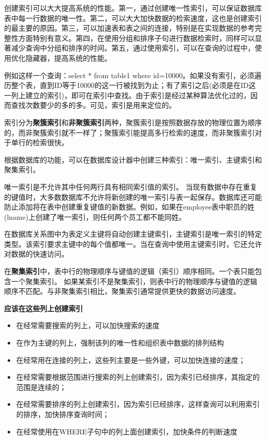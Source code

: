 创建索引可以大大提高系统的性能。第一，通过创建唯一性索引，可以保证数据库表中每一行数据的唯一性。第二，可以大大加快数据的检索速度，这也是创建索引的最主要的原因。第三，可以加速表和表之间的连接，特别是在实现数据的参考完整性方面特别有意义。第四，在使用分组和排序子句进行数据检索时，同样可以显著减少查询中分组和排序的时间。第五，通过使用索引，可以在查询的过程中，使用优化隐藏器，提高系统的性能。

例如这样一个查询：select * from table1 where id=10000。如果没有索引，必须遍历整个表，直到ID等于10000的这一行被找到为止；有了索引之后(必须是在ID这一列上建立的索引)，即可在索引中查找。由于索引是经过某种算法优化过的，因而查找次数要少的多的多。可见，索引是用来定位的。

索引分为\textbf{聚簇索引}和\textbf{非聚簇索引}两种，聚簇索引是按照数据存放的物理位置为顺序的，而非聚簇索引就不一样了；聚簇索引能提高多行检索的速度，而非聚簇索引对于单行的检索很快。

根据数据库的功能，可以在数据库设计器中创建三种索引：唯一索引、主键索引和聚集索引。


唯一索引是不允许其中任何两行具有相同索引值的索引。
当现有数据中存在重复的键值时，大多数数据库不允许将新创建的唯一索引与表一起保存。数据库还可能防止添加将在表中创建重复键值的新数据。例如，如果在employee表中职员的姓(lname)上创建了唯一索引，则任何两个员工都不能同姓。

在数据库关系图中为表定义主键将自动创建主键索引，主键索引是唯一索引的特定类型。该索引要求主键中的每个值都唯一。当在查询中使用主键索引时，它还允许对数据的快速访问。

在\textbf{聚集索引}中，表中行的物理顺序与键值的逻辑（索引）顺序相同。一个表只能包含一个聚集索引。
如果某索引不是聚集索引，则表中行的物理顺序与键值的逻辑顺序不匹配。与非聚集索引相比，聚集索引通常提供更快的数据访问速度。

\textbf{应该在这些列上创建索引}

\begin{itemize}
    \item 
在经常需要搜索的列上，可以加快搜索的速度
    \item 
在作为主键的列上，强制该列的唯一性和组织表中数据的排列结构
    \item 
在经常用在连接的列上，这些列主要是一些外键，可以加快连接的速度；
    \item 
在经常需要根据范围进行搜索的列上创建索引，因为索引已经排序，其指定的范围是连续的；
    \item 
在经常需要排序的列上创建索引，因为索引已经排序，这样查询可以利用索引的排序，加快排序查询时间；
    \item 
在经常使用在WHERE子句中的列上面创建索引，加快条件的判断速度
\end{itemize}


